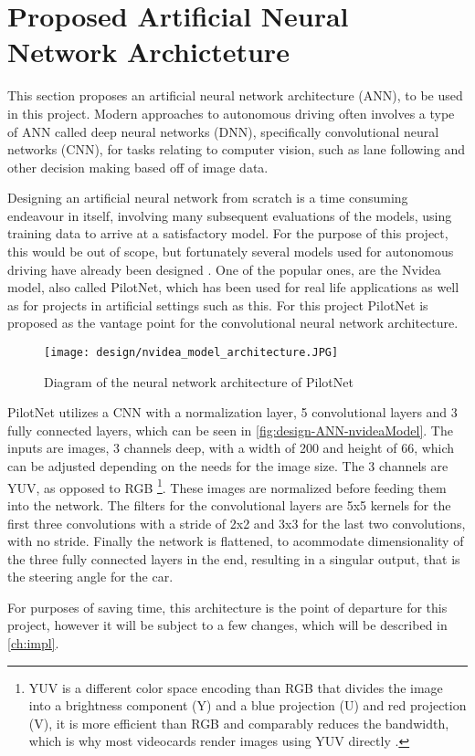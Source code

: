 \section{Proposed Artificial Neural Network Archicteture}\label{sec:design-ANN}
This section proposes an artificial neural network architecture (ANN), to be used in this project.
Modern approaches to autonomous driving often involves a type of ANN called deep neural networks (DNN), specifically convolutional neural networks (CNN), for tasks relating to computer vision, such as lane following and other decision making based off of image data.
\cite{yang_end--end_2018, patil_convnets_2019, kocic_end--end_2019, bojarski_end--end-nvidea_2016, nain_efficientnet_2019, zhang_yolo--v3_2018}

Designing an artificial neural network from scratch is a time consuming endeavour in itself, involving many subsequent evaluations of the models, using training data to arrive at a satisfactory model.
For the purpose of this project, this would be out of scope, but fortunately several models used for autonomous driving have already been designed \cite{bojarski_end--end-nvidea_2016, kocic_end--end_2019, zhang_yolo--v3_2018}.
One of the popular ones, are the Nvidea model, also called PilotNet, which has been used for real life applications as well as for projects in artificial settings such as this.
For this project PilotNet is proposed as the vantage point for the convolutional neural network architecture.

\begin{figure} [H]
    \centering
    \texttt{[image: design/nvidea\_model\_architecture.JPG]}
    \caption{Diagram of the neural network architecture of PilotNet \cite{bojarski_end--end-nvidea_2016}}
    \label{fig:design-ANN-nvideaModel}
\end{figure}

PilotNet utilizes a CNN with a normalization layer, 5 convolutional layers and 3 fully connected layers, which can be seen in \autoref{fig:design-ANN-nvideaModel}.
The inputs are images, 3 channels deep, with a width of 200 and height of 66, which can be adjusted depending on the needs for the image size.
The 3 channels are YUV, as opposed to RGB \footnote{YUV is a different color space encoding than RGB that divides the image into a brightness component (Y) and a blue projection (U) and red projection (V), it is more efficient than RGB and comparably reduces the bandwidth, which is why most videocards render images using YUV directly \cite{wikipeadia_yuv_2019, sensorray_rgb--vs--yuv_2019}.
}.
These images are normalized before feeding them into the network.
The filters for the convolutional layers are 5x5 kernels for the first three convolutions with a stride of 2x2 and 3x3 for the last two convolutions, with no stride.
Finally the network is flattened, to acommodate dimensionality of the three fully connected layers in the end, resulting in a singular output, that is the steering angle for the car.
\cite{bojarski_end--end-nvidea_2016}

For purposes of saving time, this architecture is the point of departure for this project, however it will be subject to a few changes, which will be described in \autoref{ch:impl}.
